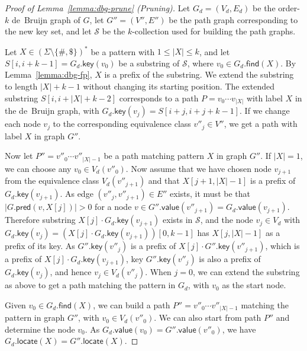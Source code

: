 \documentclass[a4paper,UKenglish]{lipics-v2016}
\newcommand{\set}[1]{\ensuremath{\{ #1 \}}}
\newcommand{\abs}[1]{\ensuremath{\lvert #1 \rvert}}
\newcommand{\find}{\ensuremath{\mathsf{find}}}
\newcommand{\locate}{\ensuremath{\mathsf{locate}}}
\newcommand{\gpred}{\ensuremath{\mathsf{pred}}}
\newcommand{\gkey}{\ensuremath{\mathsf{key}}}
\newcommand{\gvalue}{\ensuremath{\mathsf{value}}}
\newcommand{\kcollection}[1]{$#1$\nobreakdash-collection}
\newcommand{\orderk}[1]{order\nobreakdash-$#1$}
\newcommand{\patternset}{\ensuremath{(\Sigma \setminus \set{\#, \$})^{\ast}}}
\begin{document}
\begin{proof}[Proof of Lemma~\ref{lemma:dbg-prune} (Pruning)]
Let $G_{d} = (V_{d}, E_{d})$ be the \orderk{k} de~Bruijn graph of $G$, let $G'' = (V'', E'')$ be the path graph corresponding to the new key set, and let $\mathcal{S}$ be the \kcollection{k} used for building the path graphs.

Let $X \in \patternset$ be a pattern with $1 \le \abs{X} \le k$, and let $S[i, i+k-1] = G_{d}.\gkey(v_{0})$ be a substring of $\mathcal{S}$, where $v_{0} \in G_{d}.\find(X)$. By Lemma~\ref{lemma:dbg-fp}, $X$ is a prefix of the substring. We extend the substring to length $\abs{X}+k-1$ without changing its starting position. The extended substring $S[i, i+\abs{X}+k-2]$ corresponds to a path $P = v_{0} \dotsm v_{\abs{X}}$ with label $X$ in the de~Bruijn graph, with $G_{d}.\gkey(v_{j}) = S[i+j, i+j+k-1]$. If we change each node $v_{j}$ to the corresponding equivalence class $v''_{j} \in V''$, we get a path with label $X$ in graph $G''$.

Now let $P'' = v''_{0} \dotsm v''_{\abs{X}-1}$ be a path matching pattern $X$ in graph $G''$. If $\abs{X} = 1$, we can choose any $v_{0} \in V_{d}(v''_{0})$. Now assume that we have chosen node $v_{j+1}$ from the equivalence class $V_{d}(v''_{j+1})$ and that $X[j+1, \abs{X}-1]$ is a prefix of $G_{d}.\gkey(v_{j+1})$. As edge $(v''_{j}, v''_{j+1}) \in E''$ exists, it must be that $\abs{G.\gpred(v, X[j])} > 0$ for a node $v \in G''.\gvalue(v''_{j+1}) = G_{d}.\gvalue(v_{j+1})$. Therefore substring $X[j] \cdot G_{d}.\gkey(v_{j+1})$ exists in $\mathcal{S}$, and the node $v_{j} \in V_{d}$ with $G_{d}.\gkey(v_{j}) = (X[j] \cdot G_{d}.\gkey(v_{j+1}))[0, k-1]$ has $X[j, \abs{X}-1]$ as a prefix of its key. As $G''.\gkey(v''_{j})$ is a prefix of $X[j] \cdot G''.\gkey(v''_{j+1})$, which is a prefix of $X[j] \cdot G_{d}.\gkey(v_{j+1})$, key $G''.\gkey(v''_{j})$ is also a prefix of $G_{d}.\gkey(v_{j})$, and hence $v_{j} \in V_{d}(v''_{j})$. When $j = 0$, we can extend the substring as above to get a path matching the pattern in $G_{d}$, with $v_{0}$ as the start node.

Given $v_{0} \in G_{d}.\find(X)$, we can build a path $P'' = v''_{0} \dotsm v''_{\abs{X}-1}$ matching the pattern in graph $G''$, with $v_{0} \in V_{d}(v''_{0})$. We can also start from path $P''$ and determine the node $v_{0}$. As $G_{d}.\gvalue(v_{0}) = G''.\gvalue(v''_{0})$, we have $G_{d}.\locate(X) = G''.\locate(X)$.
\end{proof}
\end{document}
